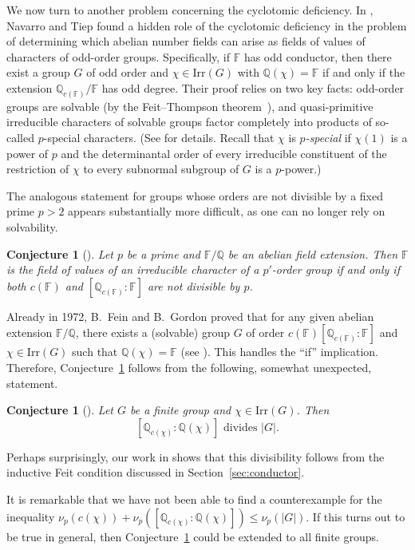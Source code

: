 \documentclass[12pt]{amsart}
\newtheorem{conjecture}[theorem]{Conjecture}
\theoremstyle{definition}
\numberwithin{equation}{section}
\newcommand{\Irr}{{\mathrm {Irr}}}
\newcommand{\QQ}{{\mathbb Q}}
\newcommand{\FF}{{\mathbb F}}
\begin{document}
We now turn to another problem concerning the cyclotomic deficiency.
In \cite[Theorem~2.7]{Navarro-Tiep21}, Navarro and Tiep found a
hidden role of the cyclotomic deficiency in the problem of
determining which abelian number fields can arise as fields of
values of characters of odd-order groups. Specifically, if $\FF$ has
odd conductor, then there exist a group $G$ of odd order and
$\chi\in\Irr(G)$ with $\QQ(\chi)=\FF$ if and only if the extension
$\QQ_{c(\FF)}/\FF$ has odd degree. Their proof relies on two key
facts: odd-order groups are solvable (by the Feit--Thompson
theorem~\cite{FT63}), and quasi-primitive irreducible characters of
solvable groups factor completely into products of so-called
$p$-special characters. (See \cite[Theorem~2.17]{I18} for details.
Recall that $\chi$ is \emph{$p$-special} if $\chi(1)$ is a power of
$p$ and the determinantal order of every irreducible constituent of
the restriction of $\chi$ to every subnormal subgroup of $G$ is a
$p$-power.)

The analogous statement for groups whose orders are not divisible by
a fixed prime $p>2$ appears substantially more difficult, as one can
no longer rely on solvability.

\begin{conjecture}[\cite{HNT25}]\label{conj:characters-p'-groups}
Let $p$ be a prime and $\FF/\QQ$ be an abelian field extension. Then
$\FF$ is the field of values of an irreducible character of a
$p'$-order group if and only if both $c(\FF)$ and
$[\QQ_{c(\FF)}:\FF]$ are not divisible by $p$.
\end{conjecture}


Already in 1972, B.~Fein and B.~Gordon proved that for any given
abelian extension $\FF/\QQ$, there exists a (solvable) group $G$ of
order $c(\FF)[\QQ_{c(\FF)}:\FF]$ and $\chi\in\Irr(G)$ such that
$\QQ(\chi)=\FF$ (see \cite[Theorem 8]{FG72}). This handles the
``if'' implication. Therefore,
Conjecture~\ref{conj:characters-p'-groups} follows from the
following, somewhat unexpected, statement.

\begin{conjecture}[\cite{HNT25}]
Let $G$ be a finite group and $\chi\in\Irr(G)$. Then
\[[\QQ_{c(\chi)}:\QQ(\chi)] \text{ divides } |G|.\]
\end{conjecture}

\noindent Perhaps surprisingly, our work in \cite{HNT25} shows that
this divisibility follows from the inductive Feit condition
discussed in Section~\ref{sec:conductor}.

It is remarkable that we have not been able to find a counterexample
for the inequality
$\nu_p(c(\chi))+\nu_p([\QQ_{c(\chi)}:\QQ(\chi)])\le \nu_p(|G|)$. If
this turns out to be true in general, then
Conjecture~\ref{conj:characters-p'-groups} could be extended to all
finite groups.
\end{document}
